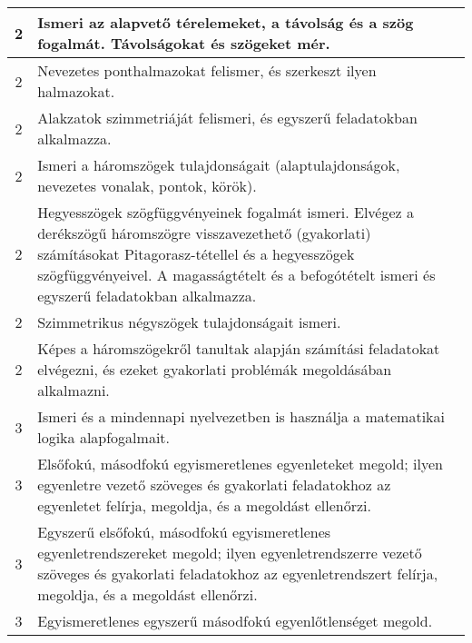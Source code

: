 \begin{longtable}{c | p{12cm} }
                                
                                          2 &  Ismeri az alapvető térelemeket, a távolság és a szög fogalmát. Távolságokat és szögeket mér. \\ \hline
                                          2 &  Nevezetes ponthalmazokat felismer, és szerkeszt ilyen halmazokat. \\ \hline
                                          2 &  Alakzatok szimmetriáját felismeri, és egyszerű feladatokban alkalmazza. \\ \hline
                                          2 &  Ismeri a háromszögek tulajdonságait (alaptulajdonságok, nevezetes vonalak, pontok, körök). \\ \hline
                                          2 &  Hegyesszögek szögfüggvényeinek fogalmát ismeri.
Elvégez a derékszögű háromszögre visszavezethető (gyakorlati) számításokat Pitagorasz-tétellel és a hegyesszögek szögfüggvényeivel. A magasságtételt és a befogótételt ismeri és egyszerű feladatokban alkalmazza. \\ \hline
                                          2 &  Szimmetrikus négyszögek tulajdonságait ismeri. \\ \hline
                                          2 &  Képes a háromszögekről tanultak alapján számítási feladatokat elvégezni, és ezeket gyakorlati problémák megoldásában alkalmazni. \\ \hline
                                      
                                
                                          3 &  Ismeri és a mindennapi nyelvezetben is használja a matematikai logika alapfogalmait. \\ \hline
                                          3 &  Elsőfokú, másodfokú egyismeretlenes egyenleteket megold; ilyen egyenletre vezető szöveges és gyakorlati feladatokhoz az egyenletet felírja, megoldja, és a megoldást ellenőrzi. \\ \hline
                                          3 &  Egyszerű elsőfokú, másodfokú egyismeretlenes egyenletrendszereket megold; ilyen egyenletrendszerre vezető szöveges és gyakorlati feladatokhoz az egyenletrendszert felírja, megoldja, és a megoldást ellenőrzi. \\ \hline
                                          3 &  Egyismeretlenes egyszerű másodfokú egyenlőtlenséget megold. \\ \hline
                                      

\end{longtable}
